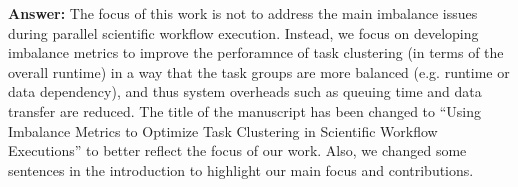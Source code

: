 \documentclass{letter}
\newcommand{\answer}[1]{%
      \textbf{Answer:} #1}
\begin{document}
\begin{letter}{}
\answer{The focus of this work is not to address the main imbalance issues during parallel scientific workflow execution. Instead, we focus on developing imbalance metrics to improve the perforamnce of task clustering (in terms of the overall runtime) in a way that the task groups are more balanced (e.g. runtime or data dependency), and thus system overheads such as queuing time and data transfer are reduced. The title of the manuscript has been changed to ``Using Imbalance Metrics to Optimize Task Clustering in Scientific Workflow Executions'' to better reflect the focus of our work. Also, we changed some sentences in the introduction to highlight our main focus and contributions.}



\end{letter}
\end{document}
